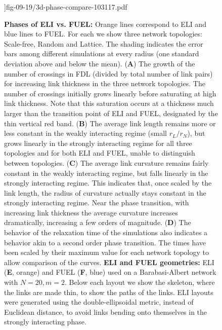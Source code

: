 \documentclass[nofootinbib,preprint,floatfix,titlepage,endfloats,superscriptaddress]{revtex4} %
\begin{document}
\begin{figure}
]{fig-09-19/3d-phase-compare-103117.pdf}
\caption{%
         \scriptsize {\bf Phases of ELI vs. FUEL:} %
         Orange lines correspond to ELI and blue lines to FUEL.
         For each we show three network topologies: Scale-free, Random and Lattice.
         The shading indicates the error bars among different simulations at every radius (one standard deviation above and below the mean).
         ({\bf A}) The growth of the number of crossings in FDL (divided by total number of link pairs) for increasing link thickness in the three network topologies. 
         The number of crossings initially grows linearly before saturating at high link thickness. 
         Note that this saturation occurs at a thickness much larger than the transition point of ELI and FUEL, designated by the thin vertical red band. 
         ({\bf B}) The average link length remains more or less constant in the weakly interacting regime (small $r_L/r_N$), but grows linearly in the strongly interacting regime for all three topologies and for both ELI and FUEL, unable to distinguish between topologies.  
         ({\bf C}) The average link curvature remains fairly constant in the weakly interacting regime, but falls linearly in the strongly interacting regime. 
         This indicates that, once scaled by the link length, the radius of curvature actually stays constant in the strongly interacting regime. 
         Near the phase transition, with increasing link thickness the average curvature increases dramatically,  increasing a few orders of magnitude. 
         ({\bf D}) The behavior of the relaxation time of the simulations also indicates a behavior akin to a second order phase transition. 
         The times have been scaled by their maximum value for each network topology to allow comparison of the curves.
         {\bf ELI and FUEL geometries:} 
         ELI ({\bf E}, orange) and FUEL ({\bf F}, blue) used on a Barabasi-Albert network with $N=20, m=2$. 
         Below each layout we show the skeleton, where the links are made thin, to show the paths of the links.
         ELI layouts were generated using the double-ellipsoidal metric, instead of Euclidean distance, to avoid links bending onto themselves in the strongly interacting phase. 
}
\end{figure}
\end{document}
